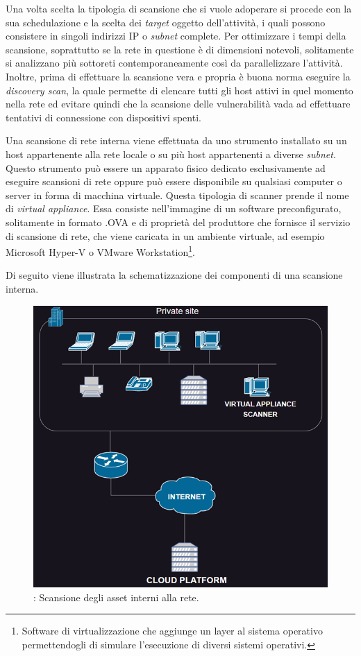 \documentclass[target=bach,aauheader=]{thud}
\begin{document}
Una volta scelta la tipologia di scansione che si vuole adoperare si procede con la sua schedulazione e la scelta dei \textit{target} oggetto dell’attività, i quali possono consistere in singoli indirizzi IP o \textit{subnet} complete. Per ottimizzare i tempi della scansione, soprattutto se la rete in questione è di dimensioni notevoli, solitamente si analizzano più sottoreti contemporaneamente così da parallelizzare l’attività. Inoltre, prima di effettuare la scansione vera e propria è buona norma eseguire la \textit{discovery scan}, la quale permette di elencare tutti gli host attivi in quel momento nella rete ed evitare quindi che la scansione delle vulnerabilità vada ad effettuare tentativi di connessione con dispositivi spenti.

Una scansione di rete interna viene effettuata da uno strumento installato su un host appartenente alla rete locale o su più host appartenenti a diverse \textit{subnet}. Questo strumento può essere un apparato fisico dedicato esclusivamente ad eseguire scansioni di rete oppure può essere disponibile su qualsiasi computer o server in forma di macchina virtuale. Questa tipologia di scanner prende il nome di \textit{virtual appliance}. Essa consiste nell’immagine di un software preconfigurato, solitamente in formato .OVA e di proprietà del produttore che fornisce il servizio di scansione di rete, che viene caricata in un ambiente virtuale, ad esempio Microsoft Hyper-V o VMware Workstation\footnote{Software di virtualizzazione che aggiunge un layer al sistema operativo permettendogli di simulare l’esecuzione di diversi sistemi operativi.}.

Di seguito viene illustrata la schematizzazione dei componenti di una scansione interna.

\begin{figure}[h]

\centering
\includegraphics{images/scan_interna.png}
    \caption{: Scansione degli asset interni alla rete.}
    \label{fig:scan_interna}
\end{figure}
\end{document}
